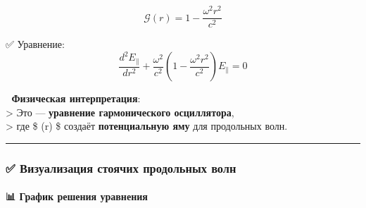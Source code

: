 \documentclass[11pt]{article}
\begin{document}
\[
\mathcal{G}(r) = 1 - \frac{\omega^2 r^2}{c^2}
\]

✅ Уравнение: \[
\frac{d^2 E_{\parallel}}{dr^2} + \frac{\omega^2}{c^2} \left( 1 - \frac{\omega^2 r^2}{c^2} \right) E_{\parallel} = 0
\]

📌 \textbf{Физическая интерпретация}:\\
\textgreater{} Это --- \textbf{уравнение гармонического осциллятора},\\
\textgreater{} где \$ (r) \$ создаёт \textbf{потенциальную
яму} для продольных волн.

\begin{center}\rule{0.5\linewidth}{\linethickness}\end{center}

\subsubsection{✅ Визуализация стоячих продольных
волн}\label{ux432ux438ux437ux443ux430ux43bux438ux437ux430ux446ux438ux44f-ux441ux442ux43eux44fux447ux438ux445-ux43fux440ux43eux434ux43eux43bux44cux43dux44bux445-ux432ux43eux43bux43d}

\paragraph{📊 График решения
уравнения}\label{ux433ux440ux430ux444ux438ux43a-ux440ux435ux448ux435ux43dux438ux44f-ux443ux440ux430ux432ux43dux435ux43dux438ux44f}
\end{document}
